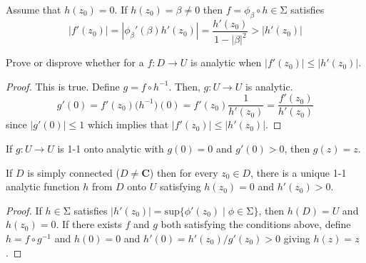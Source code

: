 \vspace{2ex}
\begin{ex}
Assume that $h(z_0)=0$. If $h(z_0)=\beta \ne 0$ then $f=\phi _{\beta }\circ h\in \mathrm{\Sigma} $ satisfies
\[|f'(z_0)|=|\phi _{\beta }'(\beta )h'(z_0)|=\dfrac{h'(z_0)}{1-|\beta |^2}>|h'(z_0)|\]
\end{ex}
\vspace{2ex}
\begin{ex}
Prove or disprove whether for a $f:D\rightarrow U$ is analytic when $|f'(z_0)|\leq |h'(z_0)|$.
\end{ex}
\vspace{2ex}
\begin{proof}
This is true. Define $g=f\circ h^{-1}$. Then, $g:U\rightarrow U$ is analytic.
\[g'(0)=f'(z_0)\big(h^{-1}\big)(0)=f'(z_0)\dfrac{1}{h'(z_0)}=\dfrac{f'(z_0)}{h'(z_0)}\]
since $|g'(0)|\leq 1$ which implies that $|f'(z_0)|\leq |h'(z_0)|$. 
\end{proof}
\vspace{2ex}
\begin{thm}
If $g:U\rightarrow U$ is 1-1 onto analytic with $g(0)=0$ and $g'(0)>0$, then $g(z)=z$. 
\end{thm}
\vspace{2ex}
\begin{thm}
If $D$ is simply connected ($D\ne {\bm C}$) then for every $z_0\in D$, there is a unique 1-1 analytic function $h$ from $D$ onto $U$ satisfying $h(z_0)=0$ and $h'(z_0)>0$.
\end{thm}
\vspace{2ex}
\begin{proof}
If $h\in \mathrm{\Sigma} $ satisfies $|h'(z_0)|=\mathrm{sup}\{\phi '(z_0)\;|\; \phi \in \mathrm{\Sigma} \}$, then $h(D)=U$ and $h(z_0)=0$. If there exists $f$ and $g$ both satisfying the conditions above, define $h=f\circ g^{-1}$ and $h(0)=0$ and $h'(0)=h'(z_0)/g'(z_0)>0$ giving $h(z)=z$. 
\end{proof}
\vspace{2ex}

